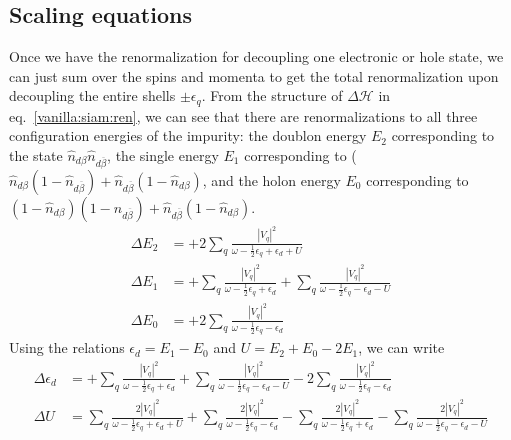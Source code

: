 \documentclass[twoside,11pt]{report}
\numberwithin{equation}{section}
\begin{document}
\subsection{Scaling equations}
Once we have the renormalization for decoupling one electronic or hole state, we can just sum over the spins and momenta to get the total renormalization upon decoupling the entire shells \(\pm \epsilon_q\). From the structure of \(\Delta \mathcal{H}\) in eq.~\ref{vanilla:siam:ren}, we can see that there are renormalizations to all three configuration energies of the impurity: the doublon energy \(E_2\) corresponding to the state  \(\hat n_{d\beta}\hat n_{d\overline\beta}\), the single energy \(E_1\) corresponding to (\(\hat n_{d\beta}(1 - \hat n_{d\overline\beta}) + \hat n_{d\overline\beta}(1 - \hat n_{d\beta})\), and the holon energy \(E_0\) corresponding to \((1 - \hat n_{d\beta})(1 - \hat n_{d\overline\beta}) + \hat n_{d\overline\beta}(1 - \hat n_{d\beta})\).
\begin{equation}\begin{aligned}
	\label{urg-siam}
	\Delta E_2 &= +2\sum_{q}\frac{|V_q|^2}{\omega - \frac{1}{2}\epsilon_q + \epsilon_d + U }\\
	\Delta E_1 &= +\sum_{q}\frac{|V_q|^2}{\omega - \frac{1}{2}\epsilon_q + \epsilon_d} + \sum_{q}\frac{|V_q|^2}{\omega - \frac{1}{2}\epsilon_q - \epsilon_d - U}\\
	\Delta E_0 &= +2\sum_{q}\frac{|V_q|^2}{\omega - \frac{1}{2}\epsilon_q - \epsilon_d}
\end{aligned}\end{equation}
Using the relations \(\epsilon_d = E_1 - E_0\) and \(U = E_2 + E_0 - 2E_1\), we can write
\begin{equation}\begin{aligned}
	\Delta \epsilon_d &= +\sum_{q}\frac{|V_q|^2}{\omega - \frac{1}{2}\epsilon_q + \epsilon_d} + \sum_{q}\frac{|V_q|^2}{\omega - \frac{1}{2}\epsilon_q - \epsilon_d - U} - 2\sum_{q}\frac{|V_q|^2}{\omega - \frac{1}{2}\epsilon_q - \epsilon_d}\\
	\Delta U &= \sum_{q}\frac{2|V_q|^2}{\omega - \frac{1}{2}\epsilon_q + \epsilon_d + U } + \sum_{q}\frac{2|V_q|^2}{\omega - \frac{1}{2}\epsilon_q - \epsilon_d} - \sum_{q}\frac{2|V_q|^2}{\omega - \frac{1}{2}\epsilon_q + \epsilon_d} - \sum_{q}\frac{2|V_q|^2}{\omega - \frac{1}{2}\epsilon_q - \epsilon_d - U}\\
\end{aligned}\end{equation}
\end{document}
